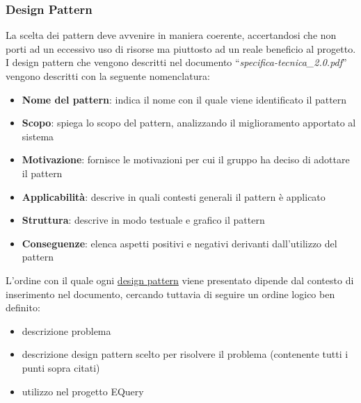 \documentclass[a4paper,11pt]{article}
\begin{document}
\subsubsection{Design Pattern}
La scelta dei pattern deve avvenire in maniera coerente, accertandosi che non porti ad un eccessivo uso di risorse ma piuttosto ad un reale beneficio al progetto. I design pattern che vengono descritti nel documento ``\textit{specifica-tecnica\_2.0.pdf}'' vengono descritti con la seguente nomenclatura:
\begin{itemize}
\item \textbf{Nome del pattern}: indica il nome con il quale viene identificato il pattern
\item \textbf{Scopo}: spiega lo scopo del pattern, analizzando il  miglioramento apportato al sistema
\item \textbf{Motivazione}: fornisce le motivazioni per cui il gruppo ha deciso di adottare il pattern
\item \textbf{Applicabilit\`a}: descrive in quali contesti generali il pattern \`e applicato
\item \textbf{Struttura}: descrive in modo testuale e grafico il pattern
\item \textbf{Conseguenze}: elenca aspetti positivi e negativi derivanti dall'utilizzo del pattern
\end{itemize}
L'ordine con il quale ogni \underline{design pattern} viene presentato dipende dal contesto di inserimento nel documento, cercando tuttavia di seguire un ordine logico ben definito:
\begin{itemize}
\item descrizione problema
\item descrizione design pattern scelto per risolvere il problema (contenente tutti i punti sopra citati)
\item utilizzo nel progetto EQuery
\end{itemize}
\end{document}
